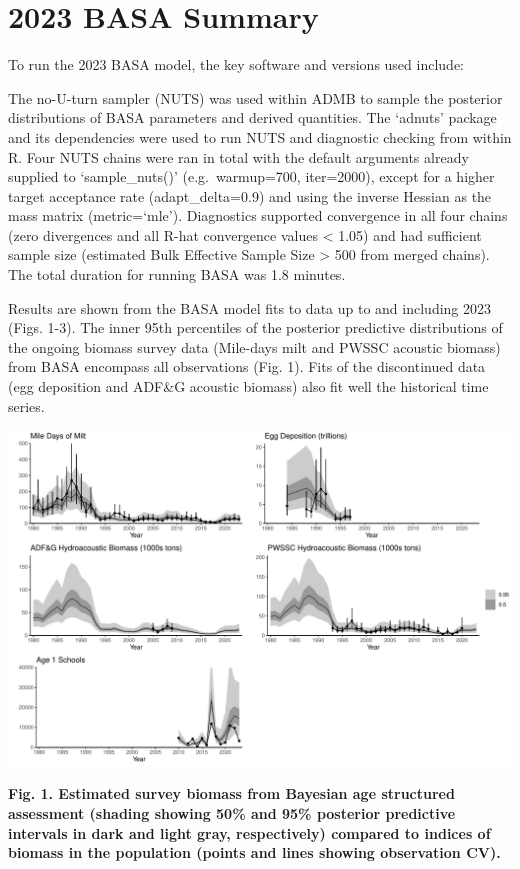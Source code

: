 \documentclass[
  11pt,
]{article}
\begin{document}
\hypertarget{basa-summary}{%
\section{2023 BASA Summary}\label{basa-summary}}

To run the 2023 BASA model, the key software and versions used include:

The no-U-turn sampler (NUTS) was used within ADMB to sample the
posterior distributions of BASA parameters and derived quantities. The
`adnuts' package and its dependencies were used to run NUTS and
diagnostic checking from within R. Four NUTS chains were ran in total
with the default arguments already supplied to `sample\_nuts()'
(e.g.~warmup=700, iter=2000), except for a higher target acceptance rate
(adapt\_delta=0.9) and using the inverse Hessian as the mass matrix
(metric=`mle'). Diagnostics supported convergence in all four chains
(zero divergences and all R-hat convergence values \textless{} 1.05) and
had sufficient sample size (estimated Bulk Effective Sample Size
\textgreater{} 500 from merged chains). The total duration for running
BASA was 1.8 minutes.

Results are shown from the BASA model fits to data up to and including
2023 (Figs. 1-3). The inner 95th percentiles of the posterior predictive
distributions of the ongoing biomass survey data (Mile-days milt and
PWSSC acoustic biomass) from BASA encompass all observations (Fig. 1).
Fits of the discontinued data (egg deposition and ADF\&G acoustic
biomass) also fit well the historical time series.

\begin{center}\includegraphics[width=0.85\linewidth]{figures/survey_fits} \end{center}

\textbf{Fig. 1. Estimated survey biomass from Bayesian age structured
assessment (shading showing 50\% and 95\% posterior predictive intervals
in dark and light gray, respectively) compared to indices of biomass in
the population (points and lines showing observation CV).}
\end{document}
